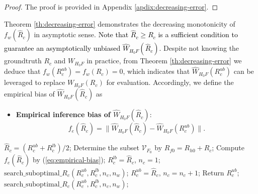 \documentclass[12pt,journal,draftclsnofoot,onecolumn]{IEEEtran}
\let \sss=\scriptscriptstyle
\begin{document}
\begin{proof}
The proof is provided in Appendix \ref{apdix:decreasing-error}. 
\end{proof}



Theorem \ref{th:decreasing-error} demonstrates the decreasing monotonicity of $f_w(\hat{R}_c)$ in asymptotic sense. 
\textcolor{black}{Note that $\hat{R}_c\ge R_c$ is a sufficient condition to guarantee an asymptotically unbiased $\hat W_{\sss{H_0 F}}(\hat{R}_c)$. }
Despite not knowing the groundtruth $R_c$ and $W_{\sss{H_0 F}}$ in practice, from Theorem \ref{th:decreasing-error} we deduce that $f_w(R_{c}^{ub})=f_w(R_{c})=0$, which indicates that $\hat W_{\sss{H_0 F}}(R_{c}^{ub})$ can be leveraged to replace $W_{\sss{H_0 F}}(R_{c})$ for evaluation. 
Accordingly, we define the empirical bias of $\hat W_{\sss{H_0 F}}(\hat{R}_c)$ as 
\begin{itemize}
\item \textbf{Empirical inference bias of $\hat W_{\sss{H_0 F}}(\hat{R}_c)$}:
\begin{equation}\label{eq:empirical-bias}
f_e(\hat{R}_c)= \| \hat W_{\sss{H_0 F}}(\hat{R}_c)  - \hat W_{\sss{H_0 F}}(R_{c}^{ub}) \|.  
\end{equation}
\end{itemize}

\begin{algorithm}[t]
    \caption{$\text{search}\_\text{suboptimal}\_R_c(R_{c}^{ub},R_{c}^{lb},n_c,n_w)$}
    \label{algo:infer-Rc}
    \begin{algorithmic}[1]
    \STATE $\hat{R}_c=(R_{c}^{ub}+R_{c}^{lb})/2$;
    \STATE Determine the subset $\mathcal{V}_{\sss F_0}$ by $R_{f0}=R_{h0}+\hat{R}_c$;
    \STATE Compute $f_e(\hat{R}_c)$ by (\ref{eq:empirical-bias});
	{
		\STATE $R_{c}^{lb}=\hat{R}_c$, $n_c=1$;
		\STATE $\text{search}\_\text{suboptimal}\_R_c(R_{c}^{ub},R_{c}^{lb},n_c,n_w)$;
	}
  	\ELSE
  	{
		\STATE $R_{c}^{ub}=\hat{R}_c$, $n_c=n_c+1$;
		{
			\STATE Return $R_{c}^{ub}$;
		}
	  	\ELSE
	  	{
	  		\STATE $\text{search}\_\text{suboptimal}\_R_c(R_{c}^{ub},R_{c}^{lb},n_c,n_w)$;
	  	}
	  	\ENDIF
  	}
  	\ENDIF
    \end{algorithmic}
\end{algorithm}
\end{document}
